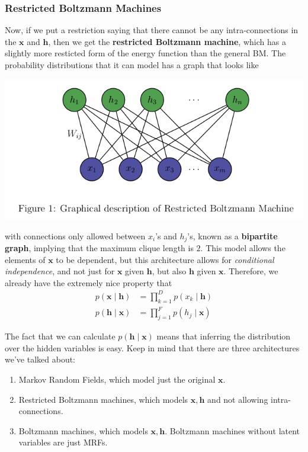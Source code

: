 \documentclass{article}
\begin{document}
    \subsubsection{Restricted Boltzmann Machines} 

      \begin{definition} 
        Now, if we put a restriction saying that there cannot be any intra-connections in the $\mathbf{x}$ and $\mathbf{h}$, then we get the \textbf{restricted Boltzmann machine}, which has a slightly more resticted form of the energy function than the general BM. The probability distributions that it can model has a graph that looks like 
        \begin{center}
          \includegraphics[scale=0.4]{img/07_Boltzmann/rbm_layer.png}
        \end{center}
        with connections only allowed between $x_i$'s and $h_j$'s, known as a \textbf{bipartite graph}, implying that the maximum clique length is $2$. This model allows the elements of $\mathbf{x}$ to be dependent, but this architecture allows for \textit{conditional independence}, and not just for $\mathbf{x}$ given $\mathbf{h}$, but also $\mathbf{h}$ given $\mathbf{x}$. Therefore, we already have the extremely nice property that 
        \begin{align*} 
          p(\mathbf{x} \mid \mathbf{h}) & = \prod_{k=1}^{D} p(x_k \mid \mathbf{h}) \\
          p(\mathbf{h} \mid \mathbf{x}) & = \prod_{j=1}^F p(h_j \mid \mathbf{x}) 
        \end{align*}
      \end{definition}

      The fact that we can calculate $p(\mathbf{h} \mid \mathbf{x})$ means that inferring the distribution over the hidden variables is easy. Keep in mind that there are three architectures we've talked about: 
      \begin{enumerate}
        \item Markov Random Fields, which model just the original $\mathbf{x}$. 
        \item Restricted Boltzmann machines, which models $\mathbf{x}, \mathbf{h}$ and not allowing intra-connections. 
        \item Boltzmann machines, which models $\mathbf{x}, \mathbf{h}$. Boltzmann machines without latent variables are just MRFs.  
      \end{enumerate}
\end{document}
